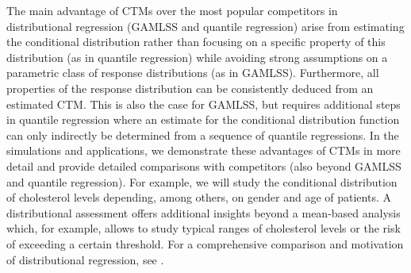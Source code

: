 \documentclass[12pt]{article}
\theoremstyle{plain}
\begin{document}
The main advantage of CTMs over the most popular competitors in distributional regression (GAMLSS and quantile regression) arise from estimating the conditional distribution rather than focusing on a specific property of this distribution (as in quantile regression) while avoiding strong assumptions on a parametric class of response distributions (as in GAMLSS). Furthermore, all properties of the response distribution can be consistently deduced from an estimated CTM. This is also the case for GAMLSS, but requires additional steps in quantile regression where an estimate for the conditional distribution function can only indirectly be determined from a sequence of quantile regressions. In the simulations and applications, we demonstrate these advantages of CTMs in more detail and provide detailed comparisons with competitors (also beyond GAMLSS and quantile regression). For example, we will study the conditional distribution of cholesterol levels depending, among others, on gender and age of patients. A distributional assessment offers additional insights beyond a mean-based analysis which, for example, allows to study typical ranges of cholesterol levels or the risk of exceeding a certain threshold. For a comprehensive comparison and motivation of distributional regression, see \citet{Kneib2022}.
\end{document}
